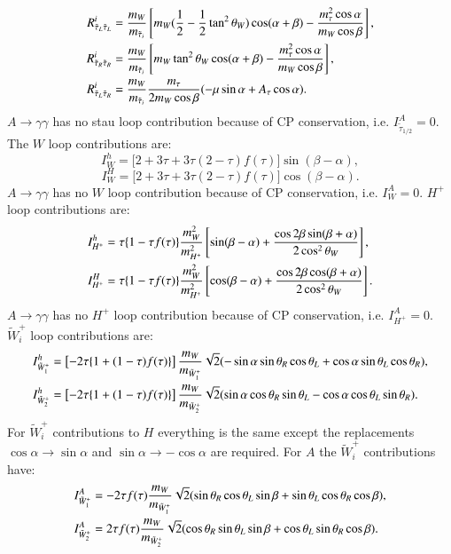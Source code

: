 \documentclass[final,3p,times,pdflatex]{elsarticle}
\begin{document}
\begin{align}
R_{\tilde{\tau}_L \tilde{\tau}_L}^i &= {m_W \over m_{\tilde{\tau}_i}}\left[m_W({1 \over 2} - {1 \over 2}\tan^2 \theta_W)\cos(\alpha+\beta) - {m_{\tau}^2 \cos \alpha \over m_W \cos\beta}\right], \\
R_{\tilde{\tau}_R \tilde{\tau}_R}^i &= {m_W \over m_{\tilde{\tau}_i}}\left[m_W \tan^2 \theta_W\cos(\alpha+\beta) - {m_{\tau}^2 \cos \alpha \over m_W \cos\beta}\right], \\
R_{\tilde{\tau}_L \tilde{\tau}_R}^i &= {m_W \over m_{\tilde{\tau}_i}}{m_\tau \over 2m_W \cos\beta}(-\mu \sin \alpha + A_\tau \cos\alpha).
\end{align}
$A \rightarrow \gamma \gamma$ has no stau loop contribution because of CP conservation, i.e. $I_{\tilde{\tau}_{1/2}}^A = 0$.
The $W$ loop contributions are:
\begin{equation}
I_{W}^h = \Big[2+3\tau +3\tau(2-\tau)f(\tau)\Big]\sin(\beta-\alpha),
\end{equation}
\begin{equation}
I_{W}^H = \Big[2+3\tau +3\tau(2-\tau)f(\tau)\Big]\cos(\beta-\alpha).
\end{equation}
$A \rightarrow \gamma \gamma$ has no $W$ loop contribution because of CP conservation, i.e. $I_{W}^A = 0$.
$H^+$ loop contributions are:
\begin{align}
I_{H^+}^h &= \tau\{1-\tau f(\tau)\}{m_{W}^2 \over m_{H^+}^2}\left[\sin(\beta - \alpha) + {\cos 2\beta \sin(\beta+\alpha) \over 2 \cos^2 \theta_W}\right], \\
I_{H^+}^H &= \tau\{1-\tau f(\tau)\}{m_{W}^2 \over m_{H^+}^2}\left[\cos(\beta - \alpha) + {\cos 2\beta \cos(\beta+\alpha) \over 2 \cos^2 \theta_W}\right].
\end{align}
$A \rightarrow \gamma \gamma$ has no $H^+$ loop contribution because of CP conservation, i.e. $I_{H^+}^A = 0$.
$\tilde{W}_{i}^+$ loop contributions are:
\begin{align}
I_{\tilde{W}_{1}^+}^h &= \left[-2\tau\{1+(1-\tau)f(\tau)\}\right]{m_{W} \over m_{\tilde{W}_{1}^+}}\sqrt{2}(-\sin\alpha \sin \theta_R \cos\theta_L + \cos\alpha \sin\theta_L \cos\theta_R), \\
I_{\tilde{W}_{2}^+}^h &= \left[-2\tau\{1+(1-\tau)f(\tau)\}\right]{m_{W} \over m_{\tilde{W}_{2}^+}}\sqrt{2}(\sin\alpha \cos \theta_R \sin\theta_L - \cos\alpha \cos\theta_L \sin\theta_R). 
\end{align}
For $\tilde{W}_{i}^+$ contributions to $H$ everything is the same except the replacements $\cos\alpha \rightarrow \sin\alpha$ and $\sin\alpha \rightarrow -\cos\alpha$ are required.
For $A$ the $\tilde{W}_{i}^+$ contributions have:
\begin{align}
I_{\tilde{W}_{1}^+}^A &= -2\tau f(\tau){m_W \over m_{\tilde{W}_{1}^+}}\sqrt{2}(\sin\theta_R \cos\theta_L \sin\beta + \sin\theta_L \cos\theta_R \cos\beta), \\
I_{\tilde{W}_{2}^+}^A &= 2\tau f(\tau){m_{W} \over m_{\tilde{W}_{2}^+}}\sqrt{2}(\cos\theta_R \sin\theta_L \sin\beta +\cos\theta_L \sin\theta_R \cos\beta).
\end{align}
\end{document}
